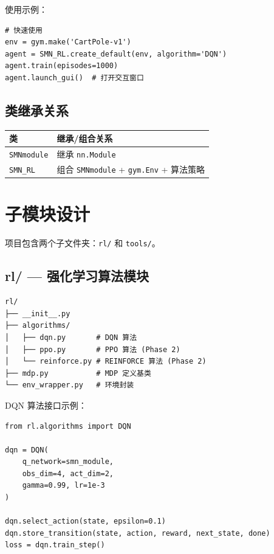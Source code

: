 \documentclass[11pt]{ctexart}
\begin{document}
使用示例：
\begin{framed}
\begin{verbatim}
# 快速使用
env = gym.make('CartPole-v1')
agent = SMN_RL.create_default(env, algorithm='DQN')
agent.train(episodes=1000)
agent.launch_gui()  # 打开交互窗口
\end{verbatim}
\end{framed}

\subsection{类继承关系}

\begin{center}
\begin{tabular}{ll}
\toprule
类 & 继承/组合关系 \\
\midrule
\texttt{SMNmodule} & 继承 \texttt{nn.Module} \\
\texttt{SMN\_RL} & 组合 \texttt{SMNmodule} + \texttt{gym.Env} + 算法策略 \\
\bottomrule
\end{tabular}
\end{center}

\section{子模块设计}

项目包含两个子文件夹：\texttt{rl/} 和 \texttt{tools/}。

\subsection{rl/ --- 强化学习算法模块}

\begin{framed}
\begin{verbatim}
rl/
├── __init__.py
├── algorithms/
│   ├── dqn.py       # DQN 算法
│   ├── ppo.py       # PPO 算法 (Phase 2)
│   └── reinforce.py # REINFORCE 算法 (Phase 2)
├── mdp.py           # MDP 定义基类
└── env_wrapper.py   # 环境封装
\end{verbatim}
\end{framed}

DQN 算法接口示例：
\begin{framed}
\begin{verbatim}
from rl.algorithms import DQN

dqn = DQN(
    q_network=smn_module,
    obs_dim=4, act_dim=2,
    gamma=0.99, lr=1e-3
)

dqn.select_action(state, epsilon=0.1)
dqn.store_transition(state, action, reward, next_state, done)
loss = dqn.train_step()
\end{verbatim}
\end{framed}
\end{document}
